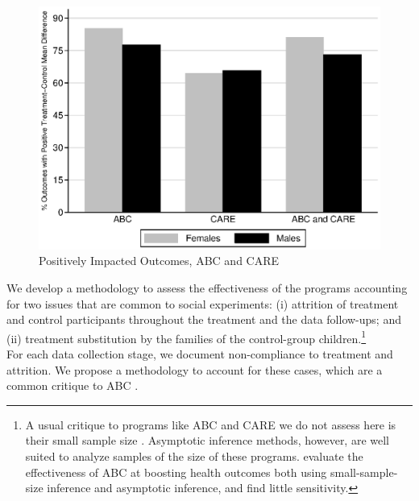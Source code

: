 \begin{figure}[H]
		\caption{Positively Impacted Outcomes, ABC and CARE} \label{fig:ppositive}
		\includegraphics[width=.9\columnwidth]{output/abccare_positiveeffects.eps}
\end{figure}


\noindent We develop a methodology to assess the effectiveness of the programs accounting for two issues that are common to social experiments: (i) attrition of treatment and control participants throughout the treatment and the data follow-ups; and (ii) treatment substitution by the families of the control-group children.\footnote{A usual critique to programs like ABC and CARE we do not assess here is their small sample size \citep{Hanushek_Lindseth_2009_BOOKSchoolhousesCourthouses}. Asymptotic inference methods, however, are well suited to analyze samples of the size of these programs. \citet{Campbell_Conti_etal_2014_EarlyChildhoodInvestments} evaluate the effectiveness of ABC at boosting health outcomes both using small-sample-size inference and asymptotic inference, and find little sensitivity.}\\

\noindent For each data collection stage, we document non-compliance to treatment and attrition. We propose a methodology to account for these cases, which are a common critique to ABC \citep{Spitz_1992_ABC-Retardation,Hu_2014_ABC-Study}.\\

